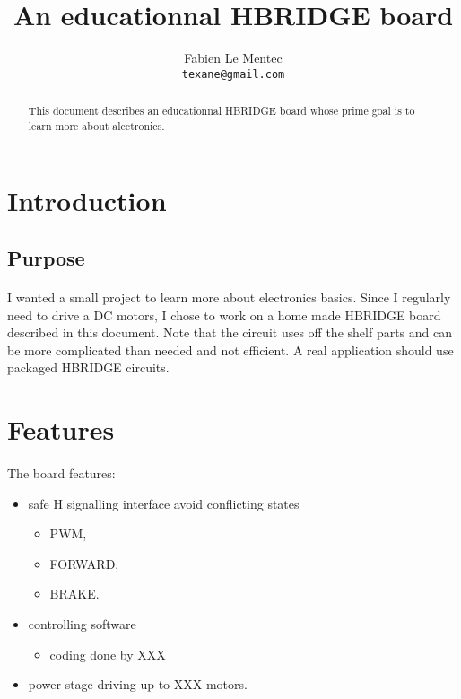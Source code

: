 \documentclass[12pt]{article}
\title{An educationnal HBRIDGE board}
\author{Fabien Le Mentec\\
\small \texttt{texane@gmail.com}
}
\date{}
\begin{document}
\maketitle

\begin{abstract}
This document describes an educationnal HBRIDGE board whose prime goal is to learn more about alectronics.
\end{abstract}


\section{Introduction}

\subsection{Purpose}
\paragraph{} I wanted a small project to learn more about electronics basics. Since I regularly need to
drive a DC motors, I chose to work on a home made HBRIDGE board described in this document. Note that
the circuit uses off the shelf parts and can be more complicated than needed and not efficient. A real
application should use packaged HBRIDGE circuits.


\section{Features}
\paragraph{} The board features:
\begin{itemize}
  \item safe H signalling interface avoid conflicting states
    \begin{itemize}
      \item PWM,
      \item FORWARD,
      \item BRAKE.
    \end{itemize}
  \item controlling software
    \begin{itemize}
      \item coding done by XXX
    \end{itemize}
  \item power stage driving up to XXX motors.
\end{itemize}
\end{document}
